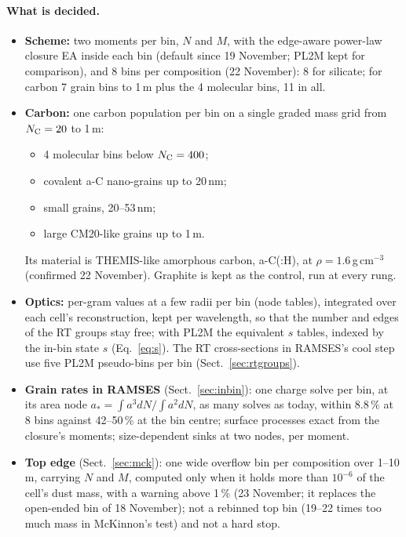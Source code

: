 \documentclass[11pt,a4paper]{article}
\newcommand{\NC}{N_{\rm C}}
\begin{document}
\paragraph{What is decided.}
\begin{itemize}
\item \textbf{Scheme:} two moments per bin, $N$ and $M$, with the edge-aware power-law closure EA inside each bin
  (default since 19 November; PL2M kept for comparison), and 8 bins per composition (22 November): 8 for silicate;
  for carbon 7 grain bins to 1\,\textmu m plus the 4 molecular bins, 11 in all.
\item \textbf{Carbon:} one carbon population per bin on a single graded mass grid from $\NC = 20$ to 1\,\textmu m:
  \begin{itemize}
  \item 4 molecular bins below $\NC = 400$;
  \item covalent a-C nano-grains up to 20\,nm;
  \item small grains, 20--53\,nm;
  \item large CM20-like grains up to 1\,\textmu m.
  \end{itemize}
  Its material is THEMIS-like amorphous carbon, a-C(:H), at $\rho = 1.6$\,g\,cm$^{-3}$ (confirmed 22 November). Graphite
  is kept as the control, run at every rung.
\item \textbf{Optics:} per-gram values at a few radii per bin (node tables), integrated over each cell's
  reconstruction, kept per wavelength, so that the number and edges of the RT groups stay free; with PL2M the
  equivalent $s$ tables, indexed by the in-bin state $s$ (Eq.~\ref{eq:s}). The RT cross-sections in RAMSES's cool step
  use five PL2M pseudo-bins per bin (Sect.~\ref{sec:rtgroups}).
\item \textbf{Grain rates in RAMSES} (Sect.~\ref{sec:inbin}): one charge solve per bin, at its area node
  $a_* = \int a^3dN/\int a^2dN$, as many solves as today, within 8.8\,\% at 8 bins against 42--50\,\% at the bin
  centre; surface processes exact from the closure's moments; size-dependent sinks at two nodes, per moment.
\item \textbf{Top edge} (Sect.~\ref{sec:mck}): one wide overflow bin per composition over 1--10\,\textmu m, carrying
  $N$ and $M$, computed only when it holds more than $10^{-6}$ of the cell's dust mass, with a warning above 1\,\%
  (23 November; it replaces the open-ended bin of 18 November); not a rebinned top bin (19--22 times too much mass in
  McKinnon's test) and not a hard stop.

\end{itemize}
\end{document}
